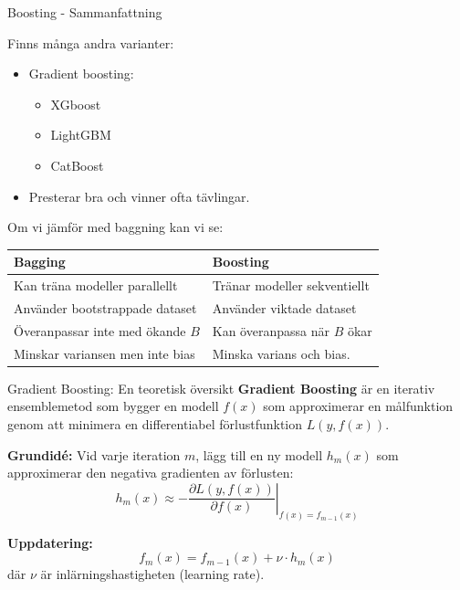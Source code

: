 \documentclass[10pt,english]{beamer}
\begin{document}
\begin{frame}{Boosting - Sammanfattning}
    
    Finns många andra varianter:
    \begin{itemize}
        \item Gradient boosting:
        \begin{itemize}
            \item XGboost
            \item LightGBM
            \item CatBoost
        \end{itemize}
        \item Presterar bra och vinner ofta tävlingar.
    \end{itemize}

    Om vi jämför med baggning kan vi se:

    \begin{tabular}{l | l}
        Bagging & Boosting \\ \hline
        Kan träna modeller parallellt & Tränar modeller sekventiellt \\
        Använder bootstrappade dataset & Använder viktade dataset \\
        Överanpassar inte med ökande $B$ & Kan överanpassa när $B$ ökar \\
        Minskar variansen men inte bias & Minska varians och bias.
        
    \end{tabular}

\end{frame}

\begin{frame}{Gradient Boosting: En teoretisk översikt}
  \textbf{Gradient Boosting} är en iterativ ensemblemetod som bygger en modell $f(x)$ 
  som approximerar en målfunktion genom att minimera en differentiabel 
  förlustfunktion $L(y, f(x))$.

  \vspace{0.4cm}
  \textbf{Grundidé:} Vid varje iteration $m$, lägg till en ny modell $h_m(x)$ 
  som approximerar den negativa gradienten av förlusten:
  \[
    h_m(x) \approx -\left.\frac{\partial L(y, f(x))}{\partial f(x)}\right|_{f(x) = f_{m-1}(x)}
  \]

  \vspace{0.4cm}
  \textbf{Uppdatering:}
  \[
    f_m(x) = f_{m-1}(x) + \nu \cdot h_m(x)
  \]
  där $\nu$ är inlärningshastigheten (learning rate).
\end{frame}
\end{document}
